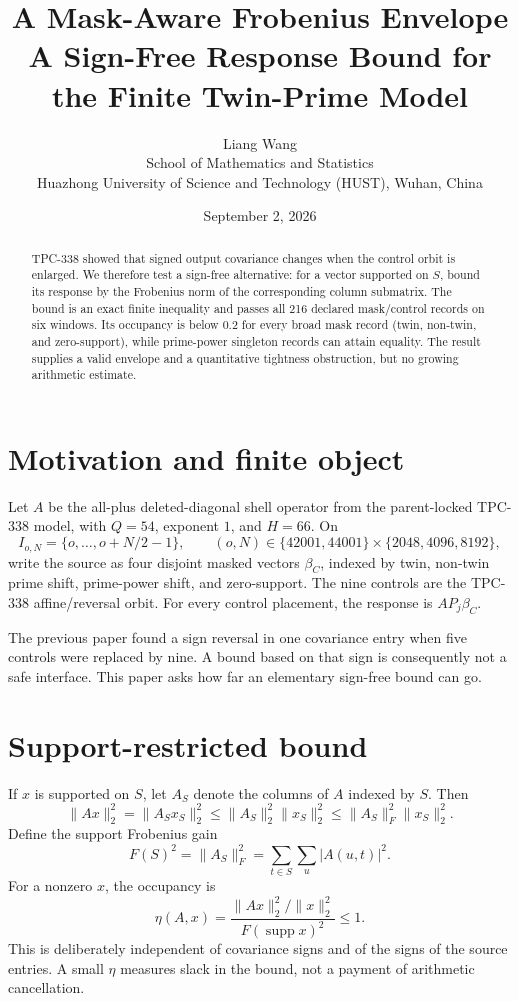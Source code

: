 \documentclass[10pt]{article}
\title{A Mask-Aware Frobenius Envelope\\
\large A Sign-Free Response Bound for the Finite Twin-Prime Model}
\author{Liang Wang\\School of Mathematics and Statistics\\
Huazhong University of Science and Technology (HUST), Wuhan, China}
\date{September 2, 2026}
\begin{document}
\maketitle

\begin{abstract}
TPC-338 showed that signed output covariance changes when the control orbit is
enlarged.  We therefore test a sign-free alternative: for a vector supported
on $S$, bound its response by the Frobenius norm of the corresponding column
submatrix.  The bound is an exact finite inequality and passes all 216 declared
mask/control records on six windows.  Its occupancy is below $0.2$ for every
broad mask record (twin, non-twin, and zero-support), while prime-power
singleton records can attain equality.  The result supplies a valid envelope
and a quantitative tightness obstruction, but no growing arithmetic estimate.
\end{abstract}

\section{Motivation and finite object}

Let $A$ be the all-plus deleted-diagonal shell operator from the parent-locked
TPC-338 model, with $Q=54$, exponent $1$, and $H=66$.  On
\[
 I_{o,N}=\{o,\ldots,o+N/2-1\},\qquad
 (o,N)\in\{42001,44001\}\times\{2048,4096,8192\},
\]
write the source as four disjoint masked vectors $\beta_C$, indexed by twin,
non-twin prime shift, prime-power shift, and zero-support.  The nine controls
are the TPC-338 affine/reversal orbit.  For every control placement, the
response is $A P_j\beta_C$.

The previous paper found a sign reversal in one covariance entry when five
controls were replaced by nine.  A bound based on that sign is consequently
not a safe interface.  This paper asks how far an elementary sign-free bound
can go.

\section{Support-restricted bound}

If $x$ is supported on $S$, let $A_S$ denote the columns of $A$ indexed by
$S$.  Then
\begin{equation}\label{eq:bound}
 \|Ax\|_2^2=\|A_Sx_S\|_2^2
 \leq \|A_S\|_2^2\|x_S\|_2^2
 \leq \|A_S\|_F^2\|x_S\|_2^2.
\end{equation}
Define the support Frobenius gain
\[
 F(S)^2=\|A_S\|_F^2=\sum_{t\in S}\sum_u|A(u,t)|^2.
\]
For a nonzero $x$, the occupancy is
\[
 \eta(A,x)=\frac{\|Ax\|_2^2/\|x\|_2^2}{F(\operatorname{supp}x)^2}\leq1.
\]
This is deliberately independent of covariance signs and of the signs of the
source entries.  A small $\eta$ measures slack in the bound, not a payment of
arithmetic cancellation.
\end{document}
